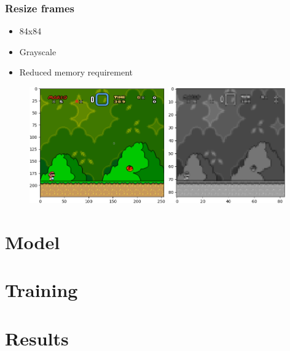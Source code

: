 \documentclass{article}
\begin{document}
    \subsubsection*{Resize frames}
    \begin{itemize}
        \item 84x84
        \item Grayscale
        \item Reduced memory requirement
    \end{itemize}
    \begin{figure}[H]
        \centering
        \includegraphics[height=5cm]{original}\hfill
        \includegraphics[height=5cm]{scaled}
    \end{figure}

    \section{Model}

    \section{Training}

    \section{Results}
\end{document}
